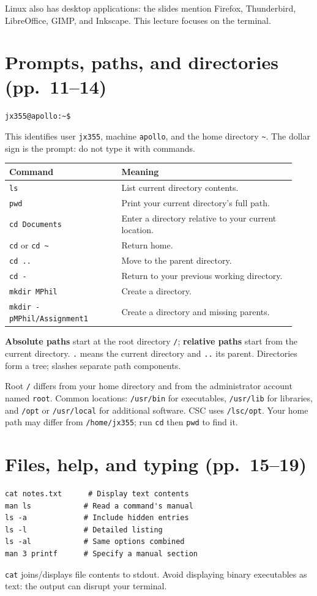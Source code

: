 \documentclass[11pt,a4paper]{article}
\begin{document}
Linux also has desktop applications: the slides mention Firefox, Thunderbird, LibreOffice, GIMP, and Inkscape. This lecture focuses on the terminal.
\section{Prompts, paths, and directories (pp.~11--14)}
\begin{lstlisting}
jx355@apollo:~$
\end{lstlisting}
This identifies user \texttt{jx355}, machine \texttt{apollo}, and the home directory \texttt{\~{}}. The dollar sign is the prompt: do not type it with commands.
\begin{longtable}{p{0.36\linewidth}p{0.57\linewidth}}
\toprule Command & Meaning \\ \midrule
\texttt{ls} & List current directory contents. \\
\texttt{pwd} & Print your current directory's full path. \\
\texttt{cd Documents} & Enter a directory relative to your current location. \\
\texttt{cd} or \texttt{cd \~{}} & Return home. \\
\texttt{cd ..} & Move to the parent directory. \\
\texttt{cd -} & Return to your previous working directory. \\
\texttt{mkdir MPhil} & Create a directory. \\
\texttt{mkdir -p}\newline\texttt{MPhil/Assignment1} & Create a directory and missing parents. \\
\bottomrule
\end{longtable}
\textbf{Absolute paths} start at the root directory \texttt{/}; \textbf{relative paths} start from the current directory. \texttt{.} means the current directory and \texttt{..} its parent. Directories form a tree; slashes separate path components.

Root \texttt{/} differs from your home directory and from the administrator account named \texttt{root}. Common locations: \texttt{/usr/bin} for executables, \texttt{/usr/lib} for libraries, and \texttt{/opt} or \texttt{/usr/local} for additional software. CSC uses \texttt{/lsc/opt}. Your home path may differ from \texttt{/home/jx355}; run \texttt{cd} then \texttt{pwd} to find it.
\section{Files, help, and typing (pp.~15--19)}
\begin{lstlisting}
cat notes.txt      # Display text contents
man ls            # Read a command's manual
ls -a             # Include hidden entries
ls -l             # Detailed listing
ls -al            # Same options combined
man 3 printf      # Specify a manual section
\end{lstlisting}
\texttt{cat} joins/displays file contents to stdout. Avoid displaying binary executables as text: the output can disrupt your terminal.
\end{document}
